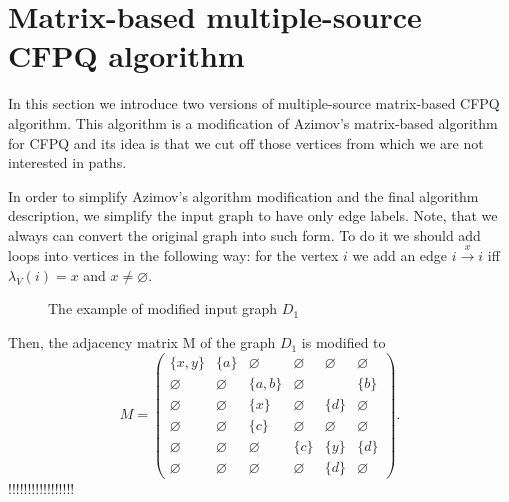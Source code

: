 \section{Matrix-based multiple-source CFPQ algorithm}
\label{sec:multiple-source-algo}

 In this section we introduce two versions of multiple-source matrix-based CFPQ algorithm.
 This algorithm is a modification of Azimov's matrix-based algorithm for CFPQ and its idea is that we cut off those vertices from which we are not interested in paths.
 

In order to simplify Azimov's algorithm modification and the final algorithm description, we simplify the input graph to have only edge labels.
Note, that we always can convert the original graph into such form. 
To do it we should add loops into vertices in the following way: for the vertex $i$ we add an edge $i \xrightarrow{x} i$ iff $\lambda_V(i) = x$ and $x\neq \varnothing$.  
\begin{figure}[h]
    \centering        
    \caption{The example of modified input graph $D_1$}
    \label{fig:example_modified_input_graph}
\end{figure}

Then, the adjacency matrix M of the graph $D_1$ is modified to
$$
    M =
    \begin{pmatrix}
    \{x, y\}     & \{a\} &   \varnothing      &   \varnothing   &   \varnothing   &   \varnothing   \\
    \varnothing     &   \varnothing   & \{a, b\} &   \varnothing   &       & \{b\} \\
    \varnothing     &   \varnothing   &   \{x\}      &   \varnothing   & \{d\} &   \varnothing   \\
    \varnothing     &   \varnothing   & \{c\}    &   \varnothing   &   \varnothing   &   \varnothing   \\
    \varnothing     &   \varnothing   &   \varnothing      & \{c\} &   \{y\}   & \{d\} \\
    \varnothing     & \varnothing     &   \varnothing      &   \varnothing   & \{d\} &   \varnothing
    \end{pmatrix}.
$$
!!!!!!!!!!!!!!!!!


